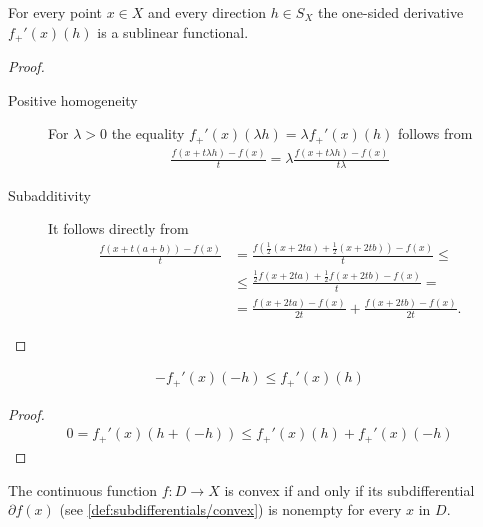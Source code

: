\begin{proposition}\label{thm:convex_one_sided_derivatives_sublinear}
  For every point $x \in X$ and every direction $h \in S_X$ the one-sided derivative $f_+'(x)(h)$ is a sublinear functional.
\end{proposition}
\begin{proof}\mbox{} %
  \begin{description}
    \item[Positive homogeneity] For $\lambda > 0$ the equality $f_+'(x)(\lambda h) = \lambda f_+'(x)(h)$ follows from
    \begin{align*}
      \frac {f(x + t \lambda h) - f(x)} t
      =
      \lambda \frac {f(x + t \lambda h) - f(x)} {t \lambda}
    \end{align*}

    \item[Subadditivity] It follows directly from
    \begin{align*}
      \frac {f(x + t(a + b)) - f(x)} t
      &=
      \frac {f(\tfrac 1 2 (x + 2ta) + \tfrac 1 2 (x + 2tb)) - f(x)} t
      \leq \\ &\leq
      \frac {\tfrac 1 2 f(x + 2ta) + \tfrac 1 2 f(x + 2tb) - f(x)} t
      = \\ &=
      \frac {f(x + 2ta) - f(x)} {2t} + \frac {f(x + 2tb) - f(x)} {2t}.
    \end{align*}
  \end{description}
\end{proof}

\begin{corollary}\label{thm:convex_one_sided_derivative_negative_inequality}
  \begin{align*}
    -f_+'(x)(-h) \leq f_+'(x)(h)
  \end{align*}
\end{corollary}
\begin{proof}
  \begin{align*}
      0 = f_+'(x)(h + (-h)) \leq f_+'(x)(h) + f_+'(x)(-h)
  \end{align*}
\end{proof}

\begin{proposition}\label{thm:convex_iff_subdifferential_nonempty}
  The continuous function $f: D \to X$ is convex if and only if its subdifferential $\partial f(x)$ (see \cref{def:subdifferentials/convex}) is nonempty for every $x$ in $D$.
\end{proposition}

